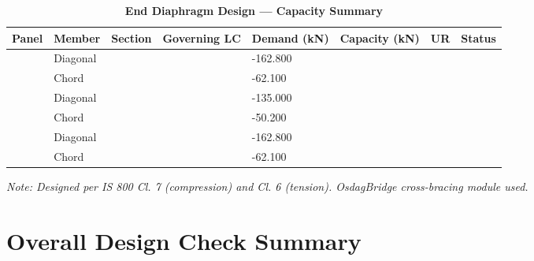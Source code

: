\documentclass[12pt,a4paper]{report}
\numberwithin{table}{chapter}
\numberwithin{figure}{chapter}
\begin{document}
\vspace{1em}

\begin{longtable}{|C{2.0cm}|L{1.8cm}|C{2.2cm}|C{3.0cm}|C{1.8cm}|C{1.8cm}|C{1.2cm}|C{1.8cm}|}
\caption{\textbf{End Diaphragm Design --- Capacity Summary}}
\hline
\textbf{Panel} & \textbf{Member} & \textbf{Section} & \textbf{Governing LC} & \textbf{Demand (kN)} & \textbf{Capacity (kN)} & \textbf{UR} & \textbf{Status} \\[6pt]
\hline
{} & Diagonal &  &  & -162.800 &  &  &  \\[6pt]
 & Chord &  &  & -62.100 &  &  &  \\[6pt]
\hline
{} & Diagonal &  &  & -135.000 &  &  &  \\[6pt]
 & Chord &  &  & -50.200 &  &  &  \\[6pt]
\hline
{} & Diagonal &  &  & -162.800 &  &  &  \\[6pt]
 & Chord &  &  & -62.100 &  &  &  \\[6pt]
\hline
\end{longtable}
\noindent\textit{Note: Designed per IS 800 Cl. 7 (compression) and Cl. 6 (tension). OsdagBridge cross-bracing module used.}

\section{Overall Design Check Summary}
\label{sec:overall-summary}
\end{document}

